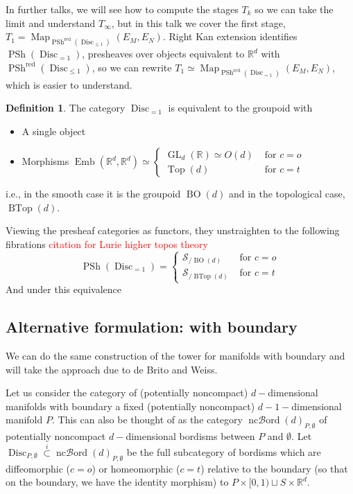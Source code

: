 \documentclass{amsart}
\DeclareMathOperator{\Emb}{Emb}
\DeclareMathOperator{\red}{red}
\DeclareMathOperator{\Map}{Map}
\DeclareMathOperator{\Disc}{Disc}
\DeclareMathOperator{\Psh}{PSh}
\DeclareMathOperator{\Top}{Top}
\DeclareMathOperator{\BTop}{BTop}
\DeclareMathOperator{\BO}{BO}
\DeclareMathOperator{\GL}{GL}
\DeclareMathOperator{\nc}{nc\mathcal{B}ord}
\theoremstyle{definition}
\newtheorem{definition}[theorem]{Definition}
\theoremstyle{remark}
\theoremstyle{example}
\begin{document}
In further talks, we will see how to compute the stages $T_k$ so we can take the limit and understand $T_{\infty}$, but in this talk we cover the first stage, $T_1 = \Map_{\Psh^{\red}(\Disc_{\leq 1})}(E_M,E_N)$. Right Kan extension identifies $\Psh({\Disc_{= 1}})$, presheaves over objects equivalent to $\mathbb{R}^d$ with $\Psh^{\red}({\Disc_{\leq 1}})$, so we can rewrite $T_1 \simeq \Map_{\Psh^{\red}(\Disc_{= 1})}(E_M,E_N)$, which is easier to understand.

\begin{definition}
    The category $\Disc_{= 1}$ is equivalent to the groupoid with
    \begin{itemize}
        \item A single object
        \item Morphisms $\Emb(\mathbb{R}^d, \mathbb{R}^d) \simeq \begin{cases}
            \GL_d(\mathbb{R}) \simeq O(d) &\text{ for } c = o\\
            \Top(d) &\text{ for } c = t
        \end{cases}$
    \end{itemize}
    i.e., in the smooth case it is the groupoid $\BO(d)$ and in the topological case, $\BTop(d)$.
\end{definition}

Viewing the presheaf categories as functors, they unstraighten to the following fibrations \textcolor{red}{citation for Lurie higher topos theory}
\[
    \Psh({\Disc_{= 1}}) = \begin{cases}
        \mathcal{S}_{/ \BO(d)} &\text{ for } c = o\\
        \mathcal{S}_{/ \BTop(d)} &\text{ for } c = t
    \end{cases}
\]
And under this equivalence
    


\subsection{Alternative formulation: with boundary}

We can do the same construction of the tower for manifolds with boundary and will take the approach due to de Brito and Weiss.

Let us consider the category of (potentially noncompact) $d-$dimensional manifolds with boundary a fixed (potentially noncompact) $d-1-$dimensional manifold $P$. This can also be thought of as the category $\nc(d)_{P,\emptyset}$ of potentially noncompact $d-$dimensional bordisms between $P$ and $\emptyset$. Let $\Disc_{P,\emptyset} \overset{i}{\subset} \nc(d)_{P,\emptyset}$ be the full subcategory of bordisms which are diffeomorphic ($c = o$) or homeomorphic ($c = t$) relative to the boundary (so that on the boundary, we have the identity morphism) to $P \times [0,1) \sqcup S \times \mathbb{R}^d$.
\end{document}
